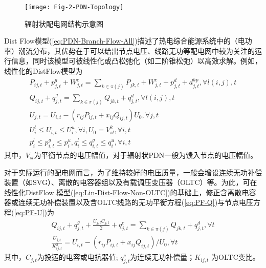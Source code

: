 \begin{figure}[H]
\centering
\texttt{[image: Fig-2-PDN-Topology]}
\caption{辐射状配电网结构示意图}
\label{Fig:PDN-Topology}
\end{figure}

Dist Flow模型(\ref{eq:PDN-Branch-Flow-All})描述了热电综合能源系统中的（电功率）潮流分布，其优势在于可以给出节点电压、线路无功等配电网中较为关注的运行信息，同时该模型可被线性化或凸松弛化（如二阶锥松弛\cite{Thesis-Liubin}）以高效求解。例如，线性化的DistFlow模型为\cite{BFM-Lin-1,BFM-Lin-2}
\begin{subequations}
\label{eq:Lin-Dist-Flow-Non-OLTC}
\begin{gather}
P_{ij,t} + p_{j,t}^g + W_{j,t}^e = \sum_{k \in \pi(j)} P_{jk,t} + W_{j,t}^c + p_{j,t}^d + d_{j,t}^{hp}, \forall l(i,j),t \label{eq:PF-P} \\
Q_{ij,t} + q_{j,t}^g = \sum_{k \in \pi(j)} Q_{jk,t} + q_{j,t}^d, \forall l(i,j),t \label{eq:PF-Q} \\
U_{j,t} = U_{i,t} - ({r_{ij} P_{ij,t} + x_{ij} Q_{ij,t}}){U_0}, \forall j,t \label{eq:PF-U} \\
U_i^l \le {U_{i,t}} \le U_i^u,\forall i,{U_0} = V_{sl}^2 , \forall i,t \\
p_i^l \le p_{i,t}^g \le p_i^u,q_i^l \le q_{i,t}^g \le q_i^u, \forall i,t
\end{gather}
\end{subequations}
其中，$V_{sl}$为平衡节点的电压幅值，对于辐射状PDN一般为馈入节点的电压幅值。

%

对于实际运行的配电网而言，为了维持较好的电压质量，一般会增设连续无功补偿装置（如SVG）、离散的电容器组以及有载调压变压器（OLTC）等。为此，可在线性化DistFlow 模型(\ref{eq:Lin-Dist-Flow-Non-OLTC})的基础上，修正含离散电容器或连续无功补偿装置以及含OLTC线路的无功平衡方程(\ref{eq:PF-Q})与节点电压方程(\ref{eq:PF-U})为\cite{PDN-Model-Reactive-Power-DT-16, CAES-IES-16-Rui}
\begin{subequations}
\label{eq:Lin-Dist-Flow-Plus-OLTC}
\begin{gather}
{Q_{ij,t}} + q_{j,t}^g + \frac{{{U_{j,t}}{C_{j,t}}}}{2} + {q_{j,t}^c} = \sum\limits_{k \in \pi \left( j \right)} {{Q_{jk,t}}}  + q_{j,t}^d,\forall t \label{eq:Lin-Dist-Flow-Plus-OLTC-1}\\
\frac{{{U_{j,t}}}}{{K_{ij,t}^2}} = {U_{i,t}} - \left( {{r_{ij}}{P_{ij,t}} + {x_{ij}}{Q_{ij,t}}} \right)/{U_0},\forall t\label{eq:Lin-Dist-Flow-Plus-OLTC-2}
\end{gather}
\end{subequations}
其中，${C_{j,t}}$为投运的电容或电抗器值; $q_{j,t}^{c}$为连续无功补偿量；$K_{ij,t}^{}$ 为OLTC变比。

